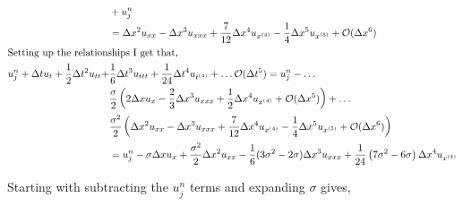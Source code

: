 \begin{enumerate}[label=\alph*., start = 1]
\begin{align*}
        & + u_j^n\\
        & = \Delta x^2 u_{xx} - \Delta x^3 u_{xxx} + \frac{7}{12}\Delta x^4 u_{x^{(4)}} - \frac{1}{4}\Delta x^5u_{x^{(5)}} + \mathcal{O}(\Delta x^6)\\
        \shortintertext{Setting up the relationships I get that,}
        u_j^n + \Delta tu_t + \frac{1}{2}\Delta t^2u_{tt} + & \frac{1}{6}\Delta t^3 u_{ttt} + \frac{1}{24}\Delta t^4u_{t^{(4)}} + \ldots \mathcal{O}(\Delta t^5)  = u_j^n - \ldots \\
        & \frac{\sigma}{2}\left( 2\Delta xu_x - \frac{2}{3}\Delta x^3 u_{xxx} + \frac{1}{2}\Delta x^4u_{x^{(4)}} + \mathcal{O}(\Delta x^5) \right) + \ldots \\
        & \frac{\sigma^2}{2}\left( \Delta x^2 u_{xx} - \Delta x^3 u_{xxx} + \frac{7}{12}\Delta x^4 u_{x^{(4)}} - \frac{1}{4}\Delta x^5u_{x^{(5)}} + \mathcal{O}(\Delta x^6) \right)\\
        & = u_j^n - \sigma\Delta xu_x + \frac{\sigma^2}{2}\Delta x^2u_{xx} - \frac{1}{6}(3\sigma^2 - 2\sigma)\Delta x^3u_{xxx} + \frac{1}{24}\left(7\sigma^2 - 6\sigma\right)\Delta x^4u_{x^{(4)}}
    \end{align*}

    \pagebreak
    Starting with subtracting the $u_j^n$ terms and expanding $\sigma$ gives,


\end{enumerate}
